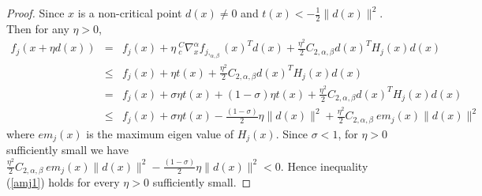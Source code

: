 \documentclass[smallextended,referee,envcountsect]{svjour3}
\begin{document}
\begin{proof}
    Since $x$ is a non-critical point $d(x)\neq 0$  and $t(x)<-\frac{1}{2} \|d(x)\|^2$. Then for any $\eta>0$,
\begin{eqnarray*}
    f_j(x+\eta d(x)) &=& f_j(x) + \eta~{}^C_c\nabla^{\alpha}_x f_{j,_{\alpha,\beta}} (x)^Td(x) +  \frac{\eta^2}{2} C_{2,\alpha,\beta}  d(x)^T H_j(x) d(x) \\
    &\leq & f_j(x)+\eta t(x)+ \frac{\eta^2}{2} C_{2,\alpha,\beta}  d(x)^T H_j(x) d(x)\\
    &=& f_j(x)+\sigma \eta t(x) + (1-\sigma)\eta t(x)+  \frac{\eta^2}{2} C_{2,\alpha,\beta}  d(x)^T H_j(x) d(x)\\
    &\leq&  f_j(x)+\sigma \eta t(x)-\frac{(1-\sigma)}{2} \eta \|d(x)\|^2+ \frac{\eta^2}{2} C_{2,\alpha,\beta}~em_j(x) \|d(x)\|^2
\end{eqnarray*}
where $em_j(x)$ is the maximum eigen value of $H_j(x)$. Since $\sigma<1$, for $\eta>0$ sufficiently small we have $\frac{\eta^2}{2} C_{2,\alpha,\beta}~em_j(x) \|d(x)\|^2-\frac{(1-\sigma)}{2} \eta \|d(x)\|^2<0.$ Hence inequality (\ref{amj1}) holds for every $\eta>0$ sufficiently small.     
\end{proof}
\end{document}
